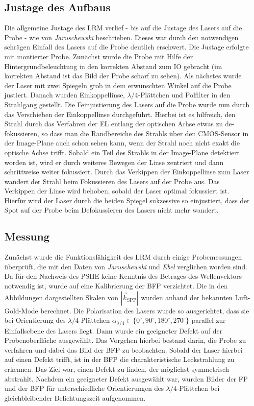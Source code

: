 \documentclass[titlepage,  ngerman]{article}
\begin{document}
	\subsection{Justage des Aufbaus}
	Die allgemeine Justage des LRM verlief - bis auf die Justage des Lasers auf die Probe - wie von \textit{Jaruschewski} \cite{Jaruschewski.2020} beschrieben. Dieses war durch den notwendigen schrägen Einfall des Lasers auf die Probe deutlich erschwert. Die Justage erfolgte mit montierter Probe. Zunächst wurde die Probe mit Hilfe der Hintergrundbeleuchtung in den korrekten Abstand zum IO gebracht (im korrekten Abstand ist das Bild der Probe scharf zu sehen). Als nächstes wurde der Laser mit zwei Spiegeln grob in dem erwünschten Winkel auf die Probe justiert. Danach wurden Einkoppellinse, $\lambda/4$-Plättchen und Polfilter in den Strahlgang gestellt. Die Feinjustierung des Lasers auf die Probe wurde nun durch das Verschieben der Einkoppellinse durchgeführt. Hierbei ist es hilfreich, den Strahl durch das Verfahren der EL entlang der optischen Achse etwas zu de-fokussieren, so dass man die Randbereiche des Strahls über den CMOS-Sensor in der Image-Plane auch schon sehen kann, wenn der Strahl noch nicht exakt die optische Achse trifft. Sobald ein Teil des Strahls in der Image-Plane detektiert worden ist, wird er durch weiteres Bewegen der Linse zentriert und dann schrittweise weiter fokussiert. Durch das Verkippen der Einkoppellinse zum Laser wandert der Strahl beim Fokussieren des Lasers auf der Probe aus. Das Verkippen der Linse wird behoben, sobald der Laser optimal fokussiert ist. Hierfür wird der Laser durch die beiden Spiegel sukzessive so einjustiert, dass der Spot auf der Probe beim Defokussieren des Lasers nicht mehr wandert.
	
		
	\subsection{Messung}
	Zunächst wurde die Funktionsfähigkeit des LRM durch einige Probemessungen überprüft, die mit den Daten von \textit{Jaruschewski} \cite{Jaruschewski.2020} und \textit{Ebel} \cite{ebel.2019} verglichen worden sind. Da für den Nachweis des PSHE keine Kenntnis des Betrages des Wellenvektors notwendig ist, wurde auf eine Kalibrierung der BFP verzichtet. Die in den Abbildungen dargestellten Skalen von $|\vec{k}_{\mathrm{SPP}}|$ wurden anhand der bekannten Luft-Gold-Mode berechnet. Die Polarisation des Lasers wurde so ausgerichtet, dass sie bei Orientierung des $\lambda/4$-Plättchen $\alpha_{\lambda/4} \in \{0^\circ, 90^\circ, 180^\circ, 270^\circ\}$ parallel zur Einfallsebene des Lasers liegt.  Dann wurde ein geeigneter Defekt auf der Probenoberfläche ausgewählt. Das Vorgehen hierbei bestand darin, die Probe zu verfahren und dabei das Bild der BFP zu beobachten. Sobald der Laser hierbei auf einen Defekt trifft, ist in der BFP die charakteristische Leckstrahlung zu erkennen. Das Ziel war, einen Defekt zu finden, der möglichst symmetrisch abstrahlt. Nachdem ein geeigneter Defekt ausgewählt war, wurden Bilder der FP und der BFP für unterschiedliche Orientierungen des $\lambda/4$-Plättchen bei gleichbleibender Belichtungszeit aufgenommen.
\end{document}
